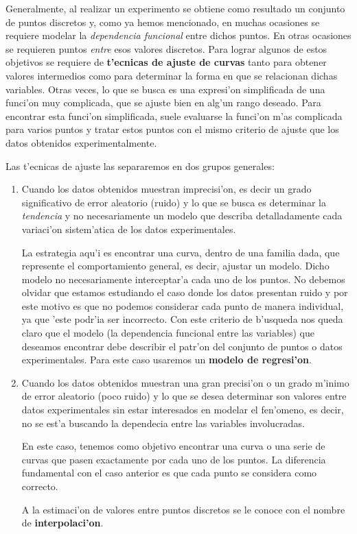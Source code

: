 \documentclass[letterpaper,11pt]{report}
\begin{document}
Generalmente, al realizar un experimento se obtiene como resultado un conjunto de puntos discretos y, como ya hemos mencionado, en muchas ocasiones se requiere modelar la \textit{dependencia funcional} entre dichos puntos. En otras ocasiones se requieren puntos \textit{entre} esos valores discretos. Para lograr algunos de estos objetivos se requiere de \textbf{t'ecnicas de ajuste de curvas} tanto para obtener valores intermedios como para determinar la forma en que se relacionan dichas variables. 
Otras veces, lo que se busca es una expresi'on simplificada de una funci'on muy complicada, que se ajuste bien en alg'un rango deseado. Para encontrar esta funci'on simplificada, suele evaluarse la funci'on m'as complicada para varios puntos y tratar estos puntos con el mismo criterio de ajuste que los datos obtenidos experimentalmente.
 
Las t'ecnicas de ajuste las separaremos en dos grupos generales:
\begin{enumerate}
\item Cuando los datos obtenidos muestran imprecisi'on, es decir un grado significativo de error aleatorio (ruido) y lo que se busca es determinar la \textit{tendencia} y no necesariamente un modelo que describa detalladamente cada variaci'on sistem'atica de los datos experimentales.

La estrategia aqu'i es encontrar una curva, dentro de una familia dada, que represente el comportamiento general, es decir, ajustar un modelo. Dicho modelo no necesariamente interceptar'a cada uno de los  puntos. No debemos olvidar que estamos estudiando el caso donde los datos presentan ruido y por este motivo es que no podemos considerar cada punto de manera individual, ya que 'este podr'ia ser incorrecto. Con este criterio de b'usqueda nos queda claro que el modelo (la dependencia funcional entre las variables) que deseamos encontrar debe describir el patr'on del conjunto de puntos o datos experimentales. Para este caso usaremos un \textbf{modelo de regresi'on}.

\item Cuando los datos obtenidos muestran una gran precisi'on o un grado m'inimo de error aleatorio (poco ruido) y lo que se desea determinar son valores entre datos experimentales sin estar interesados en modelar el fen'omeno, es decir, no se est'a buscando la dependecia entre las variables involucradas.
 
	En este caso, tenemos como objetivo encontrar una curva o una serie de curvas que pasen exactamente por cada uno de los puntos. La diferencia fundamental con el caso anterior es que cada punto se considera como correcto. 
	
A la estimaci'on de valores entre puntos discretos se le conoce con el nombre de \textbf{interpolaci'on}.
\end{enumerate}
\end{document}
